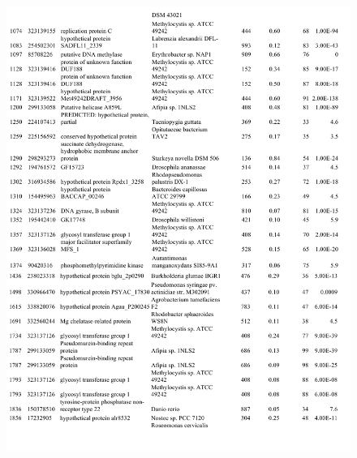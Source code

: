 \begin{figure}[H]
\centering
    \includegraphics[width=1.0\textwidth]{./tex/chapter1/figures/supplemental/TableS1c.pdf}
\end{figure}
